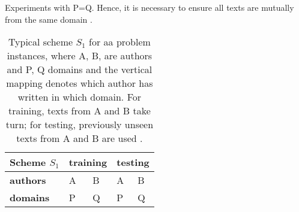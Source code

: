 \begin{definition}
    Experiments with P=Q.
    Hence, it is necessary to ensure all texts are mutually from the same domain \cite{bischoff_importance_2020}.
    \begin{table}[]
        \centering
        \caption{Typical scheme $S_1$ for \ac{aa} problem instances, where A, B, are authors and P, Q domains and 
        the vertical mapping denotes which author has written in which domain. 
        For training, texts from A and B take turn; for testing, previously unseen texts from A and B are used \cite{bischoff_importance_2020}.}
        \label{tab:within_domain_aa}
        \begin{tabular}{|l|ll|ll|}
        \hline
        \textbf{Scheme $S_1$} & \multicolumn{2}{l|}{\textbf{training}} & \multicolumn{2}{l|}{\textbf{testing}} \\ \hline
        \textbf{authors} & \multicolumn{1}{l|}{A} & B & \multicolumn{1}{l|}{A} & B \\ \hline
        \textbf{domains} & \multicolumn{1}{l|}{P} & Q & \multicolumn{1}{l|}{P} & Q \\ \hline
        \end{tabular}%
    \end{table}
\end{definition}

